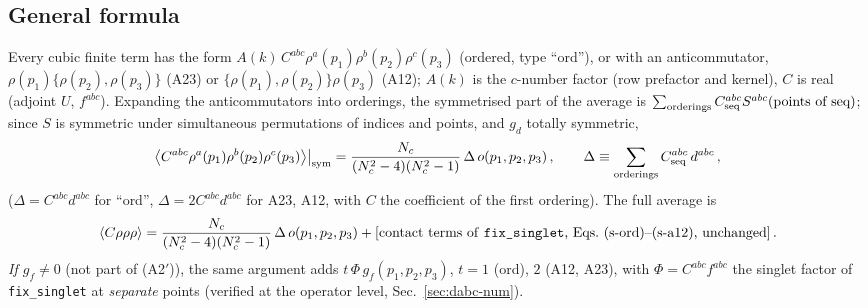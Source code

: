 \subsection{General formula}
\noindent Every cubic finite term has the form $A(k)\,C^{abc}\rho^{a}(p_{1})\rho^{b}(p_{2})\rho^{c}(p_{3})$ (ordered, type ``ord''), or with an anticommutator, $\rho(p_{1})\{\rho(p_{2}),\rho(p_{3})\}$ (A23) or $\{\rho(p_{1}),\rho(p_{2})\}\rho(p_{3})$ (A12); $A(k)$ is the $c$-number factor (row prefactor and kernel), $C$ is real (adjoint $U$, $f^{abc}$). Expanding the anticommutators into orderings, the symmetrised part of the average is $\sum_{\rm orderings}C^{abc}_{\rm seq}S^{abc}(\text{points of seq})$; since $S$ is symmetric under simultaneous permutations of indices and points, and $g_{d}$ totally symmetric,
\begin{align}
\big\langle C^{abc}\rho^{a}(p_{1})\rho^{b}(p_{2})\rho^{c}(p_{3})\big\rangle\big|_{\rm sym}=\frac{N_{c}}{(N_{c}^{2}-4)(N_{c}^{2}-1)}\,\Delta\,o(p_{1},p_{2},p_{3})\,,\qquad\Delta\equiv\sum_{\rm orderings}C^{abc}_{\rm seq}\,d^{abc}\,,\label{eq:dabc-gen}
\end{align}
($\Delta=C^{abc}d^{abc}$ for ``ord'', $\Delta=2C^{abc}d^{abc}$ for A23, A12, with $C$ the coefficient of the first ordering). The full average is
\begin{align}
\langle C\rho\rho\rho\rangle=\frac{N_{c}}{(N_{c}^{2}-4)(N_{c}^{2}-1)}\,\Delta\,o(p_{1},p_{2},p_{3})+[\text{contact terms of \texttt{fix\_singlet}, Eqs.~(s-ord)--(s-a12), unchanged}]\,.\notag
\end{align}
\emph{If $g_{f}\neq0$} (not part of (A2$'$)), the same argument adds $t\,\Phi\,g_{f}(p_{1},p_{2},p_{3})$, $t=1$ (ord), $2$ (A12, A23), with $\Phi=C^{abc}f^{abc}$ the singlet factor of \texttt{fix\_singlet} at \emph{separate} points (verified at the operator level, Sec.~\ref{sec:dabc-num}).


